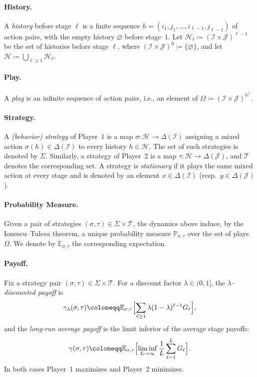 \documentclass[11pt, a4paper]{article}
\theoremstyle{plain}
\theoremstyle{definition}
\newcommand{\N}{\mathbb{N}}
\newcommand{\E}{\mathbb{E}}
\newcommand{\PR}{\mathbb{P}}
\newcommand{\defas}{\coloneqq}
\newcommand{\I}{\mathcal{I}}
\newcommand{\J}{\mathcal{J}}
\begin{document}
\paragraph{History.}
A \emph{history} before stage $\ell$ is a finite sequence $h=(i_1,j_1,\dots,i_{\ell-1},j_{\ell-1})$ of action pairs, with the empty history $\varnothing$ before stage~$1$. Let $\mathcal H_\ell\defas(\I\times\J)^{\ell-1}$ be the set of histories before stage $\ell$, where $(\I\times\J)^0\defas\{\varnothing\}$, and let $\mathcal H\defas\bigcup_{\ell\geq1}\mathcal H_\ell$.

\paragraph{Play.}
A \emph{play} is an infinite sequence of action pairs, i.e., an element of $\Omega\defas(\I\times\J)^{\N^*}$.

\paragraph{Strategy.}
A \emph{(behavior) strategy} of Player~1 is a map $\sigma\colon\mathcal H\to\Delta(\I)$ assigning a mixed action $\sigma(h)\in\Delta(\I)$ to every history $h\in\mathcal H$. 
The set of such strategies is denoted by $\Sigma$. 
Similarly, a strategy of Player~2 is a map $\tau\colon\mathcal H\to\Delta(\J)$, and $\mathcal T$ denotes the corresponding set. 
A strategy is \emph{stationary} if it plays the same mixed action at every stage and is denoted by an element $x\in\Delta(\I)$ (resp.\ $y\in\Delta(\J)$).

\paragraph{Probability Measure.}
Given a pair of strategies $(\sigma,\tau)\in\Sigma\times\mathcal T$, the dynamics above induce, by the Ionescu--Tulcea theorem, a unique probability measure $\PR_{\sigma,\tau}$ over the set of plays $\Omega$. We denote by $\E_{\sigma,\tau}$ the corresponding expectation. 

\paragraph{Payoff.}
Fix a strategy pair $(\sigma,\tau)\in\Sigma\times\mathcal T$. For a discount factor $\lambda\in(0,1]$, the \emph{$\lambda$-discounted payoff} is
\[
\gamma_\lambda(\sigma,\tau)\defas\E_{\sigma,\tau}\Bigl[\sum_{\ell\geq1}\lambda(1-\lambda)^{\ell-1}G_\ell\Bigr],
\]
and the \emph{long-run average payoff} is the limit inferior of the average stage payoffs:
\[
\gamma(\sigma,\tau)\defas\E_{\sigma,\tau}\Bigl[\liminf_{L\to\infty}\frac1L\sum_{\ell=1}^{L}G_\ell\Bigr].
\]
In both cases Player~1 maximizes and Player~2 minimizes.
\end{document}
